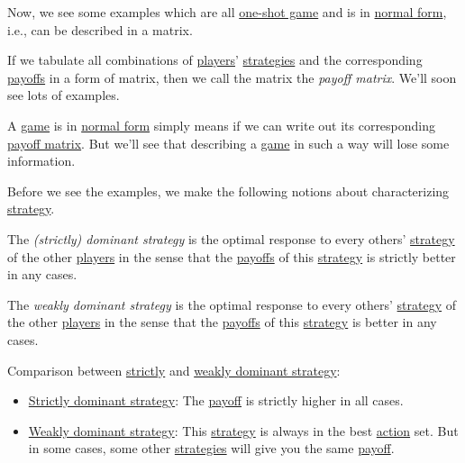 Now, we see some examples which are all \hyperref[def:one-shot-game]{one-shot game} and is in \href{https://en.wikipedia.org/wiki/Normal-form_game}{normal form}, i.e., can be described in a matrix.

\begin{definition}\label{def:payoff-matrix}
	If we tabulate all combinations of \hyperref[def:player]{players}' \hyperref[def:strategy]{strategies} and the corresponding \hyperref[def:reward]{payoffs} in a form of matrix, then we call the matrix the \emph{payoff matrix}. We'll soon see lots of examples.
\end{definition}

\begin{remark}
	A \hyperref[def:game]{game} is in \href{https://en.wikipedia.org/wiki/Normal-form_game}{normal form} simply means if we can write out its corresponding \hyperref[def:payoff-matrix]{payoff matrix}. But we'll see that describing a \hyperref[def:game]{game} in such a way will lose some information.
\end{remark}

Before we see the examples, we make the following notions about characterizing \hyperref[def:strategy]{strategy}.
\begin{definition}\label{def:dominant-strategy}
	The \emph{(strictly) dominant strategy} is the optimal response to every others' \hyperref[def:strategy]{strategy} of the other \hyperref[def:player]{players} in the sense that the \hyperref[def:reward]{payoffs} of this \hyperref[def:strategy]{strategy} is strictly better in any cases.
\end{definition}
\begin{definition}\label{def:weakly-dominant-strategy}
	The \emph{weakly dominant strategy} is the optimal response to every others' \hyperref[def:strategy]{strategy} of the other \hyperref[def:player]{players} in the sense that the \hyperref[def:reward]{payoffs} of this \hyperref[def:strategy]{strategy} is better in any cases.
\end{definition}

\begin{remark}
	Comparison between \hyperref[def:dominant-strategy]{strictly} and \hyperref[def:weakly-dominant-strategy]{weakly dominant strategy}:
	\begin{itemize}
		\item \hyperref[def:dominant-strategy]{Strictly dominant strategy}: The \hyperref[def:reward]{payoff} is strictly higher in all cases.
		\item \hyperref[def:weakly-dominant-strategy]{Weakly dominant strategy}: This \hyperref[def:strategy]{strategy} is always in the best \hyperref[def:strategy]{action} set.
		      But in some cases, some other \hyperref[def:strategy]{strategies} will give you the same \hyperref[def:reward]{payoff}.
	\end{itemize}
\end{remark}

